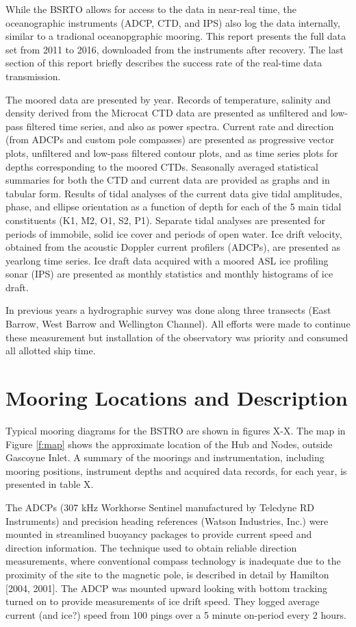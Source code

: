 \documentclass[12pt]{dforeport}
\begin{document}
While the BSRTO allows for access to the data in near-real time, the oceanographic instruments (ADCP, CTD, and IPS) also log the data internally, similar to a tradional oceanopgraphic mooring. This report presents the full data set from 2011 to 2016, downloaded from the instruments after recovery. The last section of this report briefly describes the success rate of the real-time data transmission.

The moored data are presented by year.  Records of temperature, salinity and density derived from the Microcat CTD data are presented as unfiltered and low-pass filtered time series, and also as power spectra. Current rate and direction (from ADCPs and custom pole compasses) are presented as progressive vector plots, unfiltered and low-pass filtered contour plots, and as time series plots for depths corresponding to the moored CTDs.   Seasonally averaged statistical summaries for both the CTD and current data are provided as graphs and in tabular form.  Results of tidal analyses of the current data give tidal amplitudes, phase, and ellipse orientation as a function of depth for each of the 5 main tidal constituents (K1, M2, O1, S2, P1).  Separate tidal analyses are presented for periods of immobile, solid ice cover and periods of open water. Ice drift velocity, obtained from the acoustic Doppler current profilers (ADCPs), are presented as yearlong time series.  Ice draft data acquired with a moored ASL ice profiling sonar (IPS) are presented as monthly statistics and monthly histograms of ice draft.

In previous years a hydrographic survey was done along three transects (East Barrow, West Barrow and Wellington Channel). All efforts were made to continue these measurement but installation of the observatory was priority and consumed all allotted ship time.

\section{Mooring Locations and Description}

Typical mooring diagrams for the BSTRO are shown in figures X-X.  The map in Figure \ref{f:map} shows the approximate location of the Hub and Nodes, outside Gascoyne Inlet.  A summary of the moorings and instrumentation, including mooring positions, instrument depths and acquired data records, for each year, is presented in table X.
  
The ADCPs (307 kHz Workhorse Sentinel manufactured by Teledyne RD Instruments) and precision heading references (Watson Industries, Inc.) were mounted in streamlined buoyancy packages to provide current speed and direction information.  The technique used to obtain reliable direction measurements, where conventional compass technology is inadequate due to the proximity of the site to the magnetic pole, is described in detail by Hamilton [2004, 2001]. The ADCP was mounted upward looking with bottom tracking turned on to provide measurements of ice drift speed. They logged average current (and ice?) speed from 100 pings over a 5 minute on-period every 2 hours.
\end{document}
